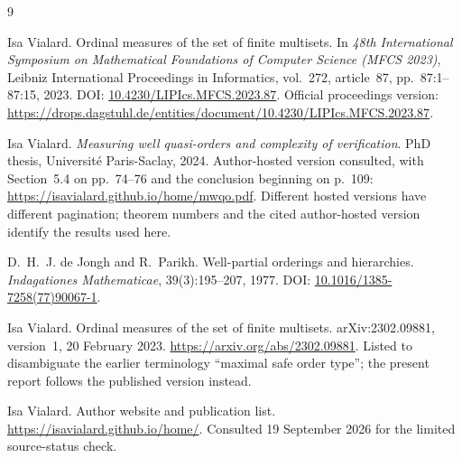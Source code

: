 \documentclass[11pt,letterpaper]{article}
\theoremstyle{definition}
\theoremstyle{remark}
\begin{document}
\clearpage
\begin{thebibliography}{9}

Isa Vialard.
\newblock Ordinal measures of the set of finite multisets.
\newblock In \emph{48th International Symposium on Mathematical Foundations
of Computer Science (MFCS 2023)}, Leibniz International Proceedings in
Informatics, vol.~272, article~87, pp.~87:1--87:15, 2023.
\newblock DOI: \href{https://doi.org/10.4230/LIPIcs.MFCS.2023.87}{10.4230/LIPIcs.MFCS.2023.87}.
\newblock Official proceedings version:
\url{https://drops.dagstuhl.de/entities/document/10.4230/LIPIcs.MFCS.2023.87}.

Isa Vialard.
\newblock \emph{Measuring well quasi-orders and complexity of verification}.
\newblock PhD thesis, Universit\'e Paris-Saclay, 2024.
\newblock Author-hosted version consulted, with Section~5.4 on pp.~74--76
and the conclusion beginning on p.~109:
\url{https://isavialard.github.io/home/mwqo.pdf}.
\newblock Different hosted versions have different pagination; theorem
numbers and the cited author-hosted version identify the results used here.

D.~H.~J. de Jongh and R.~Parikh.
\newblock Well-partial orderings and hierarchies.
\newblock \emph{Indagationes Mathematicae}, 39(3):195--207, 1977.
\newblock DOI: \href{https://doi.org/10.1016/1385-7258(77)90067-1}{10.1016/1385-7258(77)90067-1}.

Isa Vialard.
\newblock Ordinal measures of the set of finite multisets.
\newblock arXiv:2302.09881, version~1, 20 February 2023.
\newblock \url{https://arxiv.org/abs/2302.09881}.
\newblock Listed to disambiguate the earlier terminology ``maximal safe
order type''; the present report follows the published version instead.

Isa Vialard.
\newblock Author website and publication list.
\newblock \url{https://isavialard.github.io/home/}.
\newblock Consulted 19 September 2026 for the limited source-status check.

\end{thebibliography}
\end{document}
